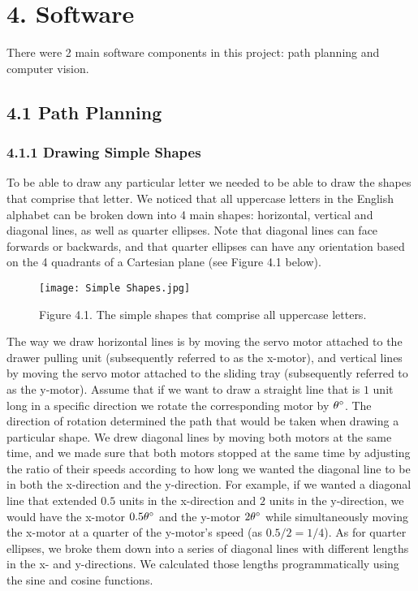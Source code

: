 \documentclass[letterpaper]{article}
\begin{document}
\section{4. Software}
There were 2 main software components in this project: path planning and computer vision.
\subsection{4.1 Path Planning}
\subsubsection{4.1.1 Drawing Simple Shapes\\}
To be able to draw any particular letter we needed to be able to draw the shapes that comprise that letter. We noticed that all uppercase letters in the English alphabet can be broken down into 4 main shapes: horizontal, vertical and diagonal lines, as well as quarter ellipses. Note that diagonal lines can face forwards or backwards, and that quarter ellipses can have any orientation based on the 4 quadrants of a Cartesian plane (see Figure 4.1 below). 

\begin{figure}[http]
    \centering
    \texttt{[image: Simple Shapes.jpg]}
    \caption*{Figure 4.1. The simple shapes that comprise all uppercase letters.}
    \label{fig 4.1}
\end{figure}
The way we draw horizontal lines is by moving the servo motor attached to the drawer pulling unit (subsequently referred to as the x-motor), and vertical lines by moving the servo motor attached to the sliding tray (subsequently referred to as the y-motor). Assume that if we want to draw a straight line that is $1$ unit long in a specific direction we rotate the corresponding motor by $\theta\degree$. The direction of rotation determined the path that would be taken when drawing a particular shape. We drew diagonal lines by moving both motors at the same time, and we made sure that both motors stopped at the same time by adjusting the ratio of their speeds according to how long we wanted the diagonal line to be in both the x-direction and the y-direction. For example, if we wanted a diagonal line that extended $0.5$ units in the x-direction and $2$ units in the y-direction, we would have the x-motor $0.5\theta\degree$ and the y-motor $2\theta\degree$ while simultaneously moving the x-motor at a quarter of the y-motor's speed (as $0.5/2 = 1/4$). As for quarter ellipses, we broke them down into a series of diagonal lines with different lengths in the x- and y-directions. We calculated those lengths programmatically using the sine and cosine functions. 
%
\end{document}
